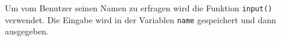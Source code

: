 
Um vom Benutzer seinen Namen zu erfragen wird die Funktion \lstinline$input()$ verwendet.
Die Eingabe wird in der Variablen \lstinline$name$ gespeichert und dann ausgegeben.



